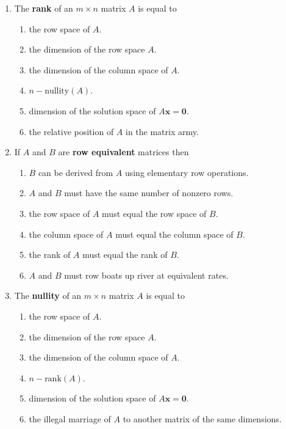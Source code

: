 \documentclass[12pt]{article}
\newcommand\rank{\ensuremath{\operatorname{rank}}}
\begin{document}
\begin{enumerate}
\item %
  The {\bf rank} of an $m \times n$ matrix $A$ is equal to
  \begin{enumerate}
  \item the row space of $A$.
  \item the dimension of the row space $A$.
  \item the dimension of the column space of $A$.
  \item $n - \mbox{nullity}(A)$.
  \item dimension of the solution space of $A \mathbf{x} = \mathbf{0}$.
  \item the relative position of $A$ in the matrix army.
  \end{enumerate}

\vskip1cm

\item %
  If $A$ and $B$ are {\bf row equivalent} matrices then
  \begin{enumerate}
  \item $B$ can be derived from $A$ using elementary row operations.
  \item $A$ and $B$ must have the same number of nonzero rows.
  \item the row space of $A$ must equal the row space of $B$.
  \item the column space of $A$ must equal the column space of $B$.
  \item the rank of $A$ must equal the rank of $B$. %
  \item $A$ and $B$ must row boats up river at equivalent rates.
  \end{enumerate}

\vskip1cm

\item %
  The {\bf nullity} of an $m \times n$ matrix $A$ is equal to
  \begin{enumerate}
  \item the row space of $A$.
  \item the dimension of the row space $A$.
  \item the dimension of the column space of $A$.
  \item $n - \mbox{rank}(A)$.
  \item dimension of the solution space of $A \mathbf{x} = \mathbf{0}$.
  \item the illegal marriage of $A$ to another matrix of the same dimensions.
  \end{enumerate}


\end{enumerate}
\end{document}
